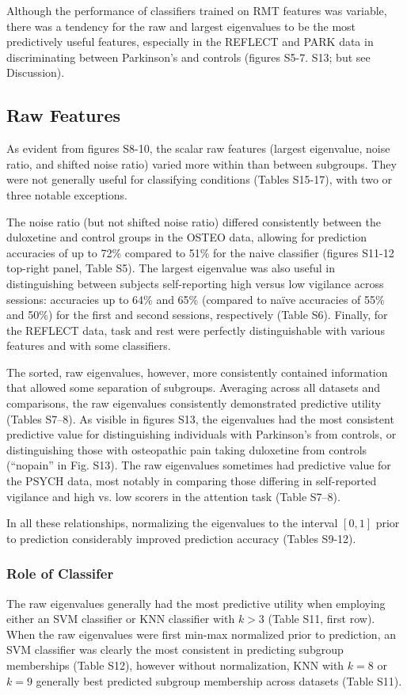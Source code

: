 \documentclass[NETN,manuscript]{stjour-new}
\begin{document}
Although the performance of classifiers trained on RMT features was variable, there was a tendency
for the raw and largest eigenvalues to be the most predictively useful features, especially in the
REFLECT and PARK data in discriminating between Parkinson's and controls (figures S5-7. S13; but see
Discussion).

\subsection{Raw Features}
As evident from figures S8-10, the scalar raw features (largest eigenvalue, noise ratio, and shifted
noise ratio) varied more within than between subgroups. They were not generally useful for
classifying conditions (Tables S15-17), with two or three notable exceptions.

The noise ratio (but not shifted noise ratio) differed consistently between the duloxetine and
control groups in the OSTEO data, allowing for prediction accuracies of up to 72\% compared to 51\%
for the naive classifier (figures S11-12 top-right panel, Table S5). The largest eigenvalue was also
useful in distinguishing between subjects self-reporting high versus low vigilance across sessions:
accuracies up to 64\% and 65\% (compared to naïve accuracies of 55\% and 50\%) for the first and
second sessions, respectively (Table S6). Finally, for the REFLECT data, task and rest were
perfectly distinguishable with various features and with some classifiers.

The sorted, raw eigenvalues, however, more consistently contained information that allowed some
separation of subgroups. Averaging across all datasets and comparisons, the raw eigenvalues
consistently demonstrated predictive utility (Tables S7--8). As visible in figures S13, the eigenvalues
had the most consistent predictive value for distinguishing individuals with Parkinson's from
controls, or distinguishing those with osteopathic pain taking duloxetine from controls (``nopain'' in
Fig. S13). The raw eigenvalues sometimes had predictive value for the PSYCH data, most notably in
comparing those differing in self-reported vigilance and high vs. low scorers in the attention task
(Table S7--8).

In all these relationships, normalizing the eigenvalues to the interval \([0,1]\) prior to
prediction considerably improved prediction accuracy (Tables S9-12).

\subsubsection{Role of Classifer}
The raw eigenvalues generally had the most predictive utility when employing either an SVM
classifier or KNN classifier with \(k > 3\) (Table S11, first row). When the raw eigenvalues were
first min-max normalized prior to prediction, an SVM classifier was clearly the most consistent in
predicting subgroup memberships (Table S12), however without normalization, KNN with \(k = 8\) or
\(k = 9\) generally best predicted subgroup membership across datasets (Table S11).
\end{document}
